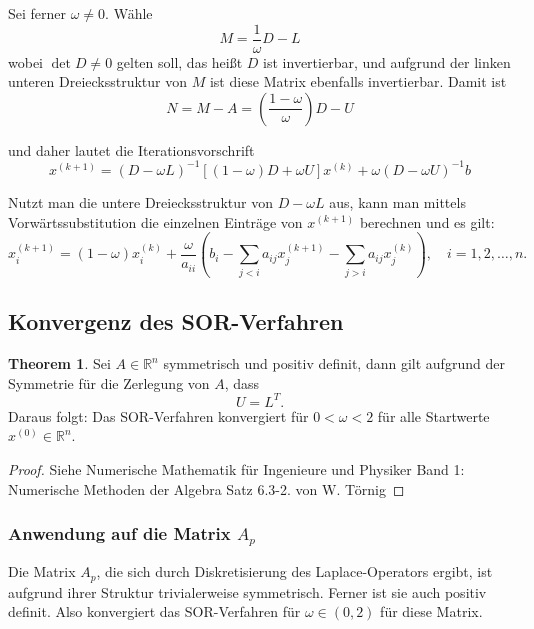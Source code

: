 \documentclass{scrartcl}
\theoremstyle{definition}
\newtheorem{theorem}{Theorem}
\begin{document}
Sei ferner \(\omega \neq 0\).
Wähle \[M = \frac{1}{\omega}D-L\] 
wobei \(\operatorname{det}D \neq 0\) gelten soll, das heißt \(D\) ist invertierbar, 
und aufgrund der linken unteren Dreiecksstruktur von \(M\)
ist diese Matrix ebenfalls invertierbar.
Damit ist \[N= M-A=(\frac{1-\omega}{\omega})D-U\]

und daher lautet die Iterationsvorschrift
\[x^{(k+1)}=(D - \omega L)^{-1}[(1- \omega)D + \omega U]x^{(k)} + \omega (D-\omega U)^{-1}b\]








Nutzt man die untere Dreiecksstruktur von \(D - \omega L\) aus, kann man mittels Vorwärtssubstitution die einzelnen 
Einträge von \(x^{(k+1)}\) berechnen und es gilt:
\[
x_i^{(k+1)} = (1 - \omega) x_i^{(k)} + \frac{\omega}{a_{ii}} 
\left( b_i - \sum_{j < i} a_{ij} x_j^{(k+1)} - \sum_{j > i} a_{ij} x_j^{(k)} \right), 
\quad i = 1, 2, \ldots, n.
\]\cite{SOR}

\subsection{Konvergenz des SOR-Verfahren}
\begin{theorem}
Sei \(A \in \mathbb{R}^n\) symmetrisch und positiv definit, dann gilt aufgrund der Symmetrie
für die Zerlegung von \(A\), dass
\[U = L^T.\]
Daraus folgt: Das SOR-Verfahren konvergiert für \(0 < \omega < 2\) für alle Startwerte \(x^{(0)} \in \mathbb{R}^n\).

\end{theorem}

\begin{proof}
   Siehe Numerische Mathematik für Ingenieure und Physiker
Band 1: Numerische Methoden der Algebra Satz 6.3-2. von W. Törnig 
\end{proof}


\subsubsection{Anwendung auf die Matrix \(A_{p}\)}
Die Matrix \(A_p\), die sich durch Diskretisierung des Laplace-Operators ergibt, ist aufgrund ihrer Struktur trivialerweise symmetrisch. Ferner ist sie auch positiv definit\cite{PosDef}.
Also konvergiert das SOR-Verfahren für \(\omega \in (0, 2)\) für diese Matrix.
\end{document}
